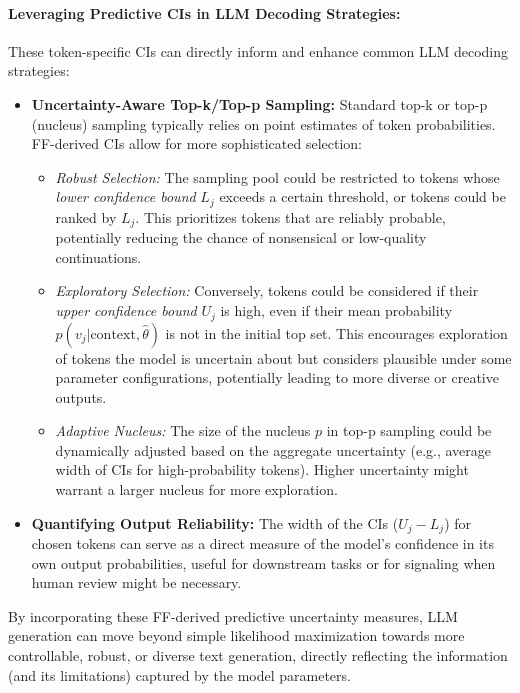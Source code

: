 \documentclass[11pt]{article}
\begin{document}
\paragraph{Leveraging Predictive CIs in LLM Decoding Strategies:}
These token-specific CIs can directly inform and enhance common LLM decoding strategies:
\begin{itemize}
    \item \textbf{Uncertainty-Aware Top-k/Top-p Sampling:} Standard top-k or top-p (nucleus) sampling \cite{holtzman2019curious} typically relies on point estimates of token probabilities. FF-derived CIs allow for more sophisticated selection:
    \begin{itemize}
        \item \textit{Robust Selection:} The sampling pool could be restricted to tokens whose \textit{lower confidence bound} $L_j$ exceeds a certain threshold, or tokens could be ranked by $L_j$. This prioritizes tokens that are reliably probable, potentially reducing the chance of nonsensical or low-quality continuations.
        \item \textit{Exploratory Selection:} Conversely, tokens could be considered if their \textit{upper confidence bound} $U_j$ is high, even if their mean probability $p(v_j | \text{context}, \hat{\theta})$ is not in the initial top set. This encourages exploration of tokens the model is uncertain about but considers plausible under some parameter configurations, potentially leading to more diverse or creative outputs.
        \item \textit{Adaptive Nucleus:} The size of the nucleus $p$ in top-p sampling could be dynamically adjusted based on the aggregate uncertainty (e.g., average width of CIs for high-probability tokens). Higher uncertainty might warrant a larger nucleus for more exploration.
    \end{itemize}
    \item \textbf{Quantifying Output Reliability:} The width of the CIs ($U_j - L_j$) for chosen tokens can serve as a direct measure of the model's confidence in its own output probabilities, useful for downstream tasks or for signaling when human review might be necessary.
\end{itemize}
By incorporating these FF-derived predictive uncertainty measures, LLM generation can move beyond simple likelihood maximization towards more controllable, robust, or diverse text generation, directly reflecting the information (and its limitations) captured by the model parameters.
\end{document}
